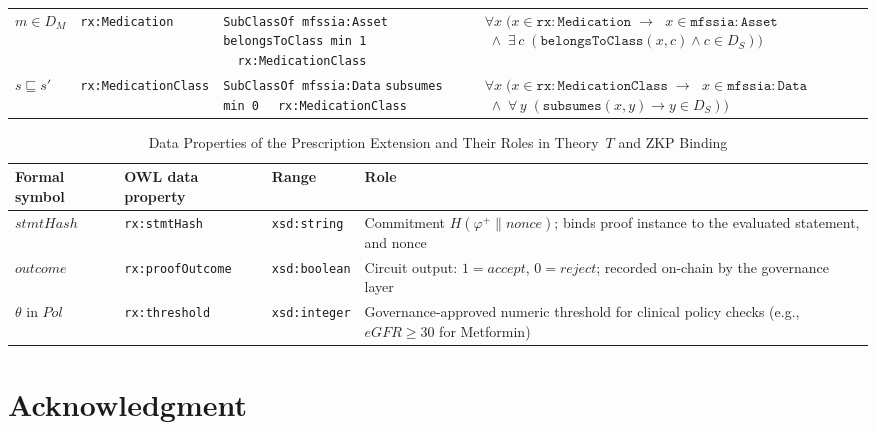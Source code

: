 \documentclass[journal]{IEEEtran}
\begin{document}
\begin{table}[tb]
\begin{tabular}{p{2.0cm} p{2.0cm} p{3.6cm} p{5.8cm}}
$m \in D_M$
  & \texttt{rx:Medi\-ca\-tion}
  & \texttt{SubClassOf mfssia:Asset} \newline
    \texttt{belongsToClass min 1} \newline
    \texttt{~~rx:MedicationClass}
  & $\forall x\;(x \in \mathtt{rx{:}Medication} \;\to$
    $\;x \in \mathtt{mfssia{:}Asset}$
    $\;\wedge\; \exists\,c\;(\mathtt{belongsToClass}(x,c) \wedge c \in D_S))$ \\[6pt]

$s \sqsubseteq s'$
  & \texttt{rx:Medi\-ca\-tion\-Class}
  & \texttt{SubClassOf mfssia:Data} \newline
    \texttt{subsumes min 0} \newline
    \texttt{~~rx:MedicationClass}
  & $\forall x\;(x \in \mathtt{rx{:}MedicationClass} \;\to$
    $\;x \in \mathtt{mfssia{:}Data}$
    $\;\wedge\; \forall\,y\;(\mathtt{subsumes}(x,y) \to y \in D_S))$ \\
\bottomrule
\end{tabular}
\end{table}

\begin{table}[tb]
\centering
\caption{Data Properties of the Prescription Extension and Their Roles in Theory~$T$ and ZKP Binding}
\label{tab:ontology-dataprops}
\small
\begin{tabular}{p{2.2cm} p{3.0cm} p{2.0cm} p{8.0cm}}
\toprule
\textbf{Formal symbol} & \textbf{OWL data property} & \textbf{Range} & \textbf{Role} \\
\midrule
$\mathit{stmtHash}$        & \texttt{rx:stmtHash}      & \texttt{xsd:string}  & Commitment $H(\varphi^{+}\!\parallel\!nonce)$; binds proof instance to the evaluated statement, and nonce \\
$\mathit{outcome}$         & \texttt{rx:proofOutcome}  & \texttt{xsd:boolean} & Circuit output: $1 = \mathit{accept}$, $0 = \mathit{reject}$; recorded on-chain by the governance layer \\
$\theta$ in $\mathit{Pol}$ & \texttt{rx:threshold}     & \texttt{xsd:integer} & Governance-approved numeric threshold for clinical policy checks (e.g., $\mathit{eGFR} \geq 30$ for Metformin) \\
\bottomrule
\end{tabular}
\end{table}


\section*{Acknowledgment}
\end{document}
